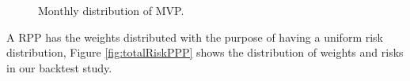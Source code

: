 \begin{figure}[H]
	\begin{subfigmatrix}{2}
	\end{subfigmatrix}
	\caption{Monthly distribution of MVP.}
	\label{fig:totalRiskMVP}
\end{figure}


A RPP has the weights distributed with the purpose of having a uniform risk distribution, Figure \ref{fig:totalRiskPPP} shows the distribution of weights and risks in our backtest study.

